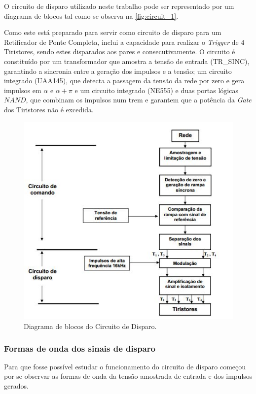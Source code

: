 \documentclass[a4paper,11pt]{article}
\numberwithin{equation}{section}
\begin{document}
O circuito de disparo utilizado neste trabalho pode ser representado por um diagrama de blocos tal como se observa na \autoref{fig:circuit_1}.

Como este está preparado para servir como circuito de disparo para um Retificador de Ponte Completa, inclui a capacidade para realizar o \textit{Trigger} de 4 Tiristores, sendo estes disparados aos pares e consecutivamente. O circuito é constituído por um transformador que amostra a tensão de entrada (TR\_SINC), garantindo a sincronia entre a geração dos impulsos e a tensão; um circuito integrado (UAA145), que detecta a passagem da tensão da rede por zero e gera impulsos em $\alpha$ e $\alpha + \pi$ e um circuito integrado (NE555) e duas portas lógicas $NAND$, que combinam os impulsos num trem e garantem que a potência da \textit{Gate} dos Tiristores não é excedida.

\begin{figure}[h]
	\centering
	\includegraphics[keepaspectratio=true, scale=0.8]{teoricas/circuito_disparo}
	\caption{Diagrama de blocos do Circuito de Disparo.}
	\label{fig:circuit_1}
	\vspace{-0.8em}
\end{figure}

\subsubsection{Formas de onda dos sinais de disparo}

Para que fosse possível estudar o funcionamento do circuito de disparo começou por se observar as formas de onda da tensão amostrada de entrada e dos impulsos gerados.
\end{document}
